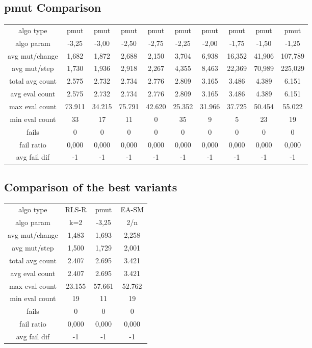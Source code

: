 \subsection{pmut Comparison}
\begin{tabular}[h]{cccccccccc}
algo type&           pmut&    pmut&    pmut&    pmut&    pmut&    pmut&    pmut&    pmut&    pmut\\
algo param&         -3,25&   -3,00&   -2,50&   -2,75&   -2,25&   -2,00&   -1,75&   -1,50&   -1,25\\
avg mut/change&     1,682&   1,872&   2,688&   2,150&   3,704&   6,938&  16,352&  41,906& 107,789\\
avg mut/step&       1,730&   1,936&   2,918&   2,267&   4,355&   8,463&  22,369&  70,989& 225,029\\
\hline
total avg count&    2.575&   2.732&   2.734&   2.776&   2.809&   3.165&   3.486&   4.389&   6.151\\
avg eval count&     2.575&   2.732&   2.734&   2.776&   2.809&   3.165&   3.486&   4.389&   6.151\\
max eval count&    73.911&  34.215&  75.791&  42.620&  25.352&  31.966&  37.725&  50.454&  55.022\\
min eval count&        33&      17&      11&       0&      35&       9&       5&      23&      19\\
\hline
fails&                  0&       0&       0&       0&       0&       0&       0&       0&       0\\
fail ratio&         0,000&   0,000&   0,000&   0,000&   0,000&   0,000&   0,000&   0,000&   0,000\\
avg fail dif&          -1&      -1&      -1&      -1&      -1&      -1&      -1&      -1&      -1\\
\end{tabular}
\subsection{Comparison of the best variants}
\begin{tabular}[h]{cccc}
algo type&         RLS-R&   pmut&  EA-SM\\
algo param&          k=2&  -3,25&    2/n\\
avg mut/change&    1,483&  1,693&  2,258\\
avg mut/step&      1,500&  1,729&  2,001\\
\hline
total avg count&   2.407&  2.695&  3.421\\
avg eval count&    2.407&  2.695&  3.421\\
max eval count&   23.155& 57.661& 52.762\\
min eval count&       19&     11&     19\\
\hline
fails&                 0&      0&      0\\
fail ratio&        0,000&  0,000&  0,000\\
avg fail dif&         -1&     -1&     -1\\
\end{tabular}
